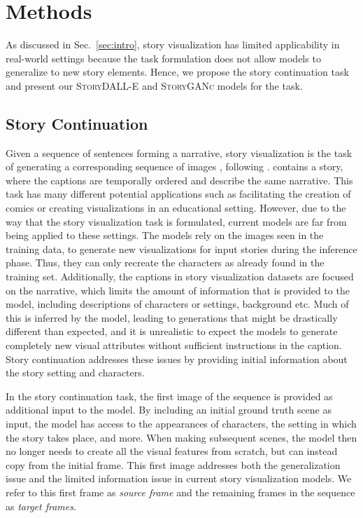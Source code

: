 \documentclass[runningheads]{llncs}
\newcommand{\sdalle}[1]{\textsc{StoryDALL-E}}
\newcommand{\sgan}[1]{\textsc{StoryGANc}}
\begin{document}
\section{Methods} \label{sec:modeling}
As discussed in Sec.~\ref{sec:intro}, story visualization has limited applicability in real-world settings because the task formulation does not allow models to generalize to new story elements. Hence, we propose the story continuation task and present our \sdalle{} and \sgan{} models for the task.

\subsection{Story Continuation}
Given a sequence of sentences  forming a narrative, story visualization is the task of generating a corresponding sequence of images , following \cite{li2019storygan}.  contains a story, where the captions are temporally ordered and describe the same narrative. This task has many different potential applications such as facilitating the creation of comics or creating visualizations in an educational setting. However, due to the way that the story visualization task is formulated, current models are far from being applied to these settings. The models rely on the images seen in the training data, to generate new visualizations for input stories during the inference phase. Thus, they can only recreate the characters as already found in the training set. Additionally, the captions in story visualization datasets are focused on the narrative, which limits the amount of information that is provided to the model, including descriptions of characters or settings, background etc. Much of this is inferred by the model, leading to generations that might be drastically different than expected, and it is unrealistic to expect the models to generate completely new visual attributes without sufficient instructions in the caption. Story continuation addresses these issues by providing initial information about the story setting and characters.

In the story continuation task, the first image of the sequence  is provided as additional input to the model. By including an initial ground truth scene as input, the model has access to the appearances of characters, the setting in which the story takes place, and more. When making subsequent scenes, the model then no longer needs to create all the visual features from scratch, but can instead copy from the initial frame. This first image addresses both the generalization issue and the limited information issue in current story visualization models. We refer to this first frame as \textit{source frame} and the remaining frames in the sequence  as \textit{target frames}.
\end{document}
